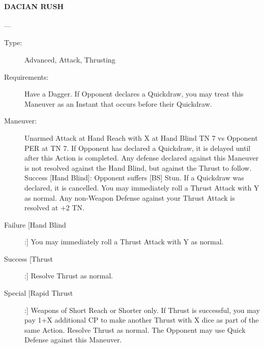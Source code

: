 \documentclass[oneside,11pt,english]{book}
\begin{document}
\paragraph{\large\label{man:DACIAN RUSH}DACIAN RUSH }---\quad{\large[2+X+Y]}
\vspace{-10pt}\begin{description}
\item [Type:] Advanced, Attack, Thrusting 
\item [Requirements:] Have a Dagger. If Opponent declares a Quickdraw, you may treat this Maneuver as an Instant that occurs before their Quickdraw.
\item [Maneuver:] Unarmed Attack at Hand Reach with X at Hand Blind TN 7 vs Opponent PER at TN 7. If Opponent has declared a Quickdraw, it is delayed until after this Action is completed. Any defense declared against this Maneuver is not resolved against the Hand Blind, but against the Thrust to follow. Success [Hand Blind]: Opponent suffers [BS] Stun. If a Quickdraw was declared, it is cancelled. You may immediately roll a Thrust Attack with Y as normal. Any non-Weapon Defense against your Thrust Attack is resolved at +2 TN.
\item [Failure [Hand Blind]:] You may immediately roll a Thrust Attack with Y as normal. 
\item [Success [Thrust]:] Resolve Thrust as normal. 
\item [Special [Rapid Thrust]:] Weapons of Short Reach or Shorter only. If Thrust is successful, you may pay 1+X additional CP to make another Thrust with X dice as part of the same Action. Resolve Thrust as normal. The Opponent may use Quick Defense against this Maneuver. 
\end{description}
\end{document}
